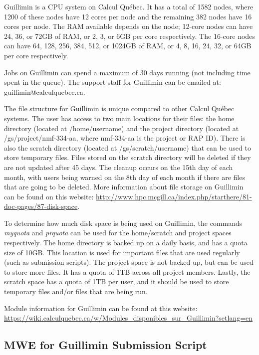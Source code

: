 \documentclass[12pt]{article}
\begin{document}
\quad Guillimin is a CPU system on Calcul Qu\'{e}bec. It has a total of 1582 nodes, where 1200 of these nodes have 12 cores per node and the remaining 382 nodes have 16 cores per node. The RAM available depends on the node; 12-core nodes can have 24, 36, or 72GB of RAM, or 2, 3, or 6GB per core respectively. The 16-core nodes can have 64, 128, 256, 384, 512, or 1024GB of RAM, or 4, 8, 16, 24, 32, or 64GB per core respectively.

\quad Jobs on Guillimin can spend a maximum of 30 days running (not including time spent in the queue). The support staff for Guillimin can be emailed at: guillimin@calculquebec.ca.

\quad The file structure for Guillimin is unique compared to other Calcul Qu\'{e}bec systems. The user has access to two main locations for their files: the home directory (located at /home/username) and the project directory (located at /gs/project/nmf-334-aa, where nmf-334-aa is the project or RAP ID). There is also the scratch directory (located at /gs/scratch/username) that can be used to store temporary files. Files stored on the scratch directory will be deleted if they are not updated after 45 days. The cleanup occurs on the 15th day of each month, with users being warned on the 8th day of each month if there are files that are going to be deleted. More information about file storage on Guillimin can be found on this website: \url{http://www.hpc.mcgill.ca/index.php/starthere/81-doc-pages/87-disk-space}.

\quad To determine how much disk space is being used on Guillimin, the commands \textit{myquota} and \textit{prquota} can be used for the home/scratch and project spaces respectively. The home directory is backed up on a daily basis, and has a quota size of 10GB. This location is used for important files that are used regularly (such as submission scripts). The project space is not backed up, but can be used to store more files. It has a quota of 1TB across all project members. Lastly, the scratch space has a quota of 1TB per user, and it should be used to store temporary files and/or files that are being run.

\quad Module information for Guillimin can be found at this website: \url{https://wiki.calculquebec.ca/w/Modules_disponibles_sur_Guillimin?setlang=en}

\subsection{MWE for Guillimin Submission Script}
\end{document}
